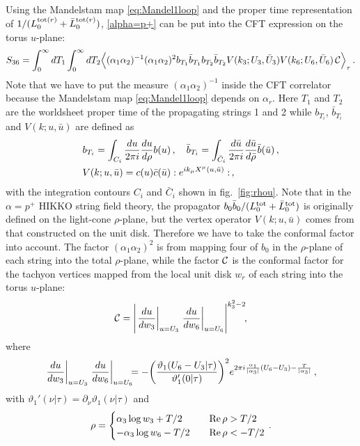 \documentclass[12pt]{article}
\begin{document}
Using the Mandelstam map \eqref{eq:Mandel1loop} and the proper time
representation of $1/(L_0^{{\rm tot}(r)}+\bar L_0^{{\rm tot}(r)})$,
\eqref{alpha=p+} can be put into the CFT expression on the torus
$u$-plane:
\begin{align}
S_{36}=\int_0^\infty dT_1\int_0^\infty dT_2
\Big\langle(\alpha_1\alpha_2)^{-1}(\alpha_1\alpha_2)^2
b_{T_1}\bar b_{T_1}b_{T_2}\bar b_{T_2}
V(k_3;U_3,\bar U_3)V(k_6;U_6,\bar U_6)\,{\cal C}\Big\rangle_\tau\,.
\label{apCFT}
\end{align}
Note that we have to put the measure $(\alpha_1\alpha_2)^{-1}$ inside
the CFT correlator because the Mandelstam map \eqref{eq:Mandel1loop}
depends on $\alpha_r$.
Here $T_1$ and $T_2$ are the worldsheet proper time of the propagating
strings 1 and 2 while $b_{T_i}$, $\bar b_{T_i}$ and 
$V(k;u,\bar u)$ are defined as
\begin{align}
&b_{T_i}=\int_{C_i}{du\over 2\pi i}{du\over d\rho}b(u)\,,\quad
\bar b_{T_i}
=\int_{\bar C_i}{d\bar u\over 2\pi i}{d\bar u\over d\bar\rho}
\bar b(\bar u)\,,\\
&V(k;u,\bar{u})=
c(u)\bar{c}(\bar{u}):e^{ik_{\mu}X^{\mu}(u,\bar{u})}:\,,
\end{align}
with the integration contours $C_i$ and $\bar C_i$ shown in
fig.~\ref{fig:rhou}.
Note that in the $\alpha=p^+$ HIKKO string field theory, the
propagator $b_0\bar b_0/(L_0^{{\rm tot}}+\bar L_0^{{\rm tot}})$ is
originally defined on the light-cone $\rho$-plane, but the vertex
operator $V(k;u,\bar u)$ comes from that constructed on the unit
disk.
Therefore we have to take the conformal factor into account.
The factor $(\alpha_1\alpha_2)^2$ is from mapping four of $b_0$ in the
$\rho$-plane of each string into the total $\rho$-plane, while the
factor ${\cal C}$ is the conformal factor for the tachyon vertices
mapped from the local unit disk $w_r$ of each string into the torus
$u$-plane:
\begin{align}
{\cal C}=\left|
\left.{du\over dw_3}\right|_{u=U_3}
\left.{du\over dw_6}\right|_{u=U_6}
\right|^{k_3^2-2}\!\!,
\end{align}
where
\begin{align}
\left.{du\over dw_3}\right|_{u=U_3}
\left.{du\over dw_6}\right|_{u=U_6}\!\!\!=
-\biggl({\vartheta_1(U_6-U_3|\tau)
\over\vartheta_1'(0|\tau)}\biggr)^2
e^{2\pi i\frac{\alpha_1}{|\alpha_3|}(U_6-U_3)-\frac{T}{|\alpha_3|}}\,,
\end{align}
with $\vartheta_1'(\nu|\tau)=\partial_\nu\vartheta_1(\nu|\tau)$ and
\begin{align}
\rho=\begin{cases}\alpha_3\log w_3+T/2&\quad{\rm Re}\,\rho>T/2\\
-\alpha_3\log w_6-T/2&\quad{\rm Re}\,\rho<-T/2\end{cases}\,.
\end{align}
\end{document}
